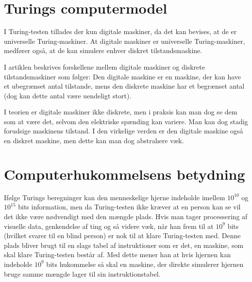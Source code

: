 \documentclass{article}
\author{Mikkel K. Mathiesen, Jannik Gram, Rune \& Rasmus Abrahams{\tt (son|en)}}
\title{}
\date{\today}
\begin{document}
\maketitle
\section{Turings computermodel}



I Turing-testen tillades der kun digitale maskiner, da det kan bevises, at de er universelle Turing-maskiner. At digitale maskiner er universelle Turing-maskiner, medfører også, at de kan simulere enhver diskret tilstandsmaskine.

I artiklen beskrives forskellene mellem digitale maskiner og diskrete tilstandsmaskiner som følger: Den digitale maskine er en maskine, der kan have et ubegrænset antal tilstande, mens den diskrete maskine har et begrænset antal (dog kan dette antal være uendeligt stort).

I teorien er digitale maskiner ikke diskrete, men i praksis kan man dog se dem som at være det, selvom den elektriske spænding kan variere. Man kan dog stadig forudsige maskinens tilstand. I den virkelige verden er den digitale maskine også en diskret maskine, men dette kan man dog abstrahere væk.

\section{Computerhukommelsens betydning}
Ifølge Turings beregninger kan den menneskelige hjerne indeholde imellem $10^{10}$ og $10^{15}$ bits information, men da Turing-testen ikke kræver at en person kan se vil det ikke være nødvendigt med den mængde plads. Hvis man tager processering af visuelle data, genkendelse af ting og så videre væk, når han frem til at $10^9$ bits (hvilket svarer til en blind person) er nok til at klare Turing-testen med. Denne plads bliver brugt til en slags tabel af instruktioner som er det, en maskine, som skal klare Turing-testen består af. Med dette mener han at hvis hjernen kan indeholde $10^9$ bits hukommelse så skal en maskine, der direkte simulerer hjernen bruge samme mængde lager til sin instruktionstabel.
\end{document}
